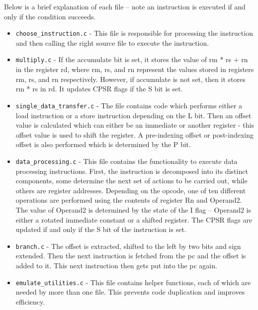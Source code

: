 \documentclass[11pt]{article}
\begin{document}
Below is a brief explanation of each file – note an instruction is executed if and only if the condition succeeds. 
\begin{itemize}
    \item \texttt{choose\_instruction.c} - This file is responsible for processing the instruction and then calling the right source file to execute the instruction. 
    \item \texttt{multiply.c} - If the accumulate bit is set, it stores the value of rm * rs + rn in the register rd, where rm, rs, and rn represent the values stored in registers rm, rs, and rn respectively. However, if accumulate is not set, then it stores rm * rs in rd. It updates CPSR flags if the S bit is set. 
    \item \texttt{single\_data\_transfer.c} - The file contains code which performs either a load instruction or a store instruction depending on the L bit. Then an offset value is calculated which can either be an immediate or another register - this offset value is used to shift the register. A pre-indexing offset or post-indexing offset is also performed which is determined by the P bit. 
    \item \texttt{data\_processing.c} - This file contains the functionality to execute data processing instructions. First, the instruction is decomposed into its distinct components, some determine the next set of actions to be carried out, while others are register addresses. Depending on the opcode, one of ten different operations are performed using the contents of register Rn and Operand2. The value of Operand2 is determined by the state of the I flag – Operand2 is either a rotated immediate constant or a shifted register. The CPSR flags are updated if and only if the S bit of the instruction is set. 
    \item \texttt{branch.c} - The offset is extracted, shifted to the left by two bits and sign extended. Then the next instruction is fetched from the pc and the offset is added to it. This next instruction then gets put into the pc again. 
    \item \texttt{emulate\_utilities.c} - This file contains helper functions, each of which are needed by more than one file. This prevents code duplication and improves efficiency.
    
\end{itemize}
\end{document}

